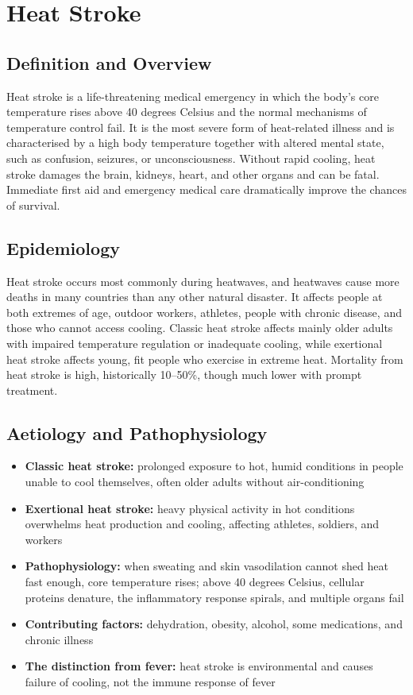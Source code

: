 \chapter{Heat Stroke}

\section*{Definition and Overview}
Heat stroke is a life-threatening medical emergency in which the body's core temperature rises above 40 degrees Celsius and the normal mechanisms of temperature control fail. It is the most severe form of heat-related illness and is characterised by a high body temperature together with altered mental state, such as confusion, seizures, or unconsciousness. Without rapid cooling, heat stroke damages the brain, kidneys, heart, and other organs and can be fatal. Immediate first aid and emergency medical care dramatically improve the chances of survival.

\section*{Epidemiology}
Heat stroke occurs most commonly during heatwaves, and heatwaves cause more deaths in many countries than any other natural disaster. It affects people at both extremes of age, outdoor workers, athletes, people with chronic disease, and those who cannot access cooling. Classic heat stroke affects mainly older adults with impaired temperature regulation or inadequate cooling, while exertional heat stroke affects young, fit people who exercise in extreme heat. Mortality from heat stroke is high, historically 10--50\%, though much lower with prompt treatment.

\section*{Aetiology and Pathophysiology}
\begin{itemize}
    \item \textbf{Classic heat stroke:} prolonged exposure to hot, humid conditions in people unable to cool themselves, often older adults without air-conditioning
    \item \textbf{Exertional heat stroke:} heavy physical activity in hot conditions overwhelms heat production and cooling, affecting athletes, soldiers, and workers
    \item \textbf{Pathophysiology:} when sweating and skin vasodilation cannot shed heat fast enough, core temperature rises; above 40 degrees Celsius, cellular proteins denature, the inflammatory response spirals, and multiple organs fail
    \item \textbf{Contributing factors:} dehydration, obesity, alcohol, some medications, and chronic illness
    \item \textbf{The distinction from fever:} heat stroke is environmental and causes failure of cooling, not the immune response of fever
\end{itemize}

